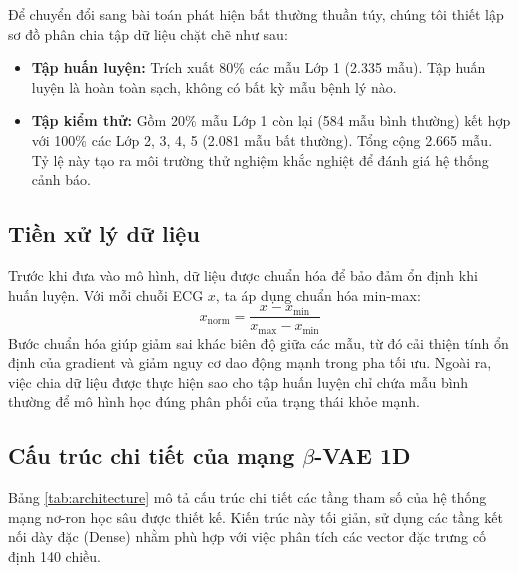 \documentclass[conference]{IEEEtran}
\begin{document}
Để chuyển đổi sang bài toán phát hiện bất thường thuần túy, chúng tôi thiết lập sơ đồ phân chia tập dữ liệu chặt chẽ như sau:
\begin{itemize}
\item \textbf{Tập huấn luyện:} Trích xuất 80\% các mẫu Lớp 1 (2.335 mẫu). Tập huấn luyện là hoàn toàn sạch, không có bất kỳ mẫu bệnh lý nào.
\item \textbf{Tập kiểm thử:} Gồm 20\% mẫu Lớp 1 còn lại (584 mẫu bình thường) kết hợp với 100\% các Lớp 2, 3, 4, 5 (2.081 mẫu bất thường). Tổng cộng 2.665 mẫu. Tỷ lệ này tạo ra môi trường thử nghiệm khắc nghiệt để đánh giá hệ thống cảnh báo.
\end{itemize}

\subsection{Tiền xử lý dữ liệu}
Trước khi đưa vào mô hình, dữ liệu được chuẩn hóa để bảo đảm ổn định khi huấn luyện. Với mỗi chuỗi ECG \(x\), ta áp dụng chuẩn hóa min-max:
\begin{equation}
x_{\text{norm}} = \frac{x - x_{\min}}{x_{\max} - x_{\min}}
\end{equation}
Bước chuẩn hóa giúp giảm sai khác biên độ giữa các mẫu, từ đó cải thiện tính ổn định của gradient và giảm nguy cơ dao động mạnh trong pha tối ưu. Ngoài ra, việc chia dữ liệu được thực hiện sao cho tập huấn luyện chỉ chứa mẫu bình thường để mô hình học đúng phân phối của trạng thái khỏe mạnh.

\subsection{Cấu trúc chi tiết của mạng \(\beta\)-VAE 1D}
Bảng \ref{tab:architecture} mô tả cấu trúc chi tiết các tầng tham số của hệ thống mạng nơ-ron học sâu được thiết kế. Kiến trúc này tối giản, sử dụng các tầng kết nối dày đặc (Dense) nhằm phù hợp với việc phân tích các vector đặc trưng cố định 140 chiều.
\end{document}
